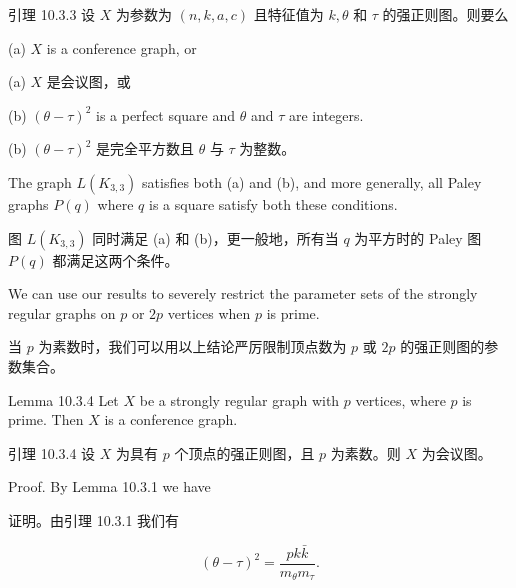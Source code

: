 \documentclass[10pt]{article}
\begin{document}
\begin{tcolorbox}\relax
引理 10.3.3 设 \(X\) 为参数为 \(\left( {n,k,a,c}\right)\) 且特征值为 \(k,\theta\) 和 \(\tau\) 的强正则图。则要么
\end{tcolorbox}

(a) \(X\) is a conference graph, or

\begin{tcolorbox}\relax
(a) \(X\) 是会议图，或
\end{tcolorbox}

(b) \({\left( \theta  - \tau \right) }^{2}\) is a perfect square and \(\theta\) and \(\tau\) are integers.

\begin{tcolorbox}\relax
(b) \({\left( \theta  - \tau \right) }^{2}\) 是完全平方数且 \(\theta\) 与 \(\tau\) 为整数。
\end{tcolorbox}

The graph \(L\left( {K}_{3,3}\right)\) satisfies both (a) and (b), and more generally, all Paley graphs \(P\left( q\right)\) where \(q\) is a square satisfy both these conditions.

\begin{tcolorbox}\relax
图 \(L\left( {K}_{3,3}\right)\) 同时满足 (a) 和 (b)，更一般地，所有当 \(q\) 为平方时的 Paley 图 \(P\left( q\right)\) 都满足这两个条件。
\end{tcolorbox}

We can use our results to severely restrict the parameter sets of the strongly regular graphs on \(p\) or \({2p}\) vertices when \(p\) is prime.

\begin{tcolorbox}\relax
当 \(p\) 为素数时，我们可以用以上结论严厉限制顶点数为 \(p\) 或 \({2p}\) 的强正则图的参数集合。
\end{tcolorbox}

Lemma 10.3.4 Let \(X\) be a strongly regular graph with \(p\) vertices, where \(p\) is prime. Then \(X\) is a conference graph.

\begin{tcolorbox}\relax
引理 10.3.4 设 \(X\) 为具有 \(p\) 个顶点的强正则图，且 \(p\) 为素数。则 \(X\) 为会议图。
\end{tcolorbox}

Proof. By Lemma 10.3.1 we have

\begin{tcolorbox}\relax
证明。由引理 10.3.1 我们有
\end{tcolorbox}

\[
{\left( \theta  - \tau \right) }^{2} = \frac{{pk}\bar{k}}{{m}_{\theta }{m}_{\tau }}. \tag{10.3}
\]
\end{document}
